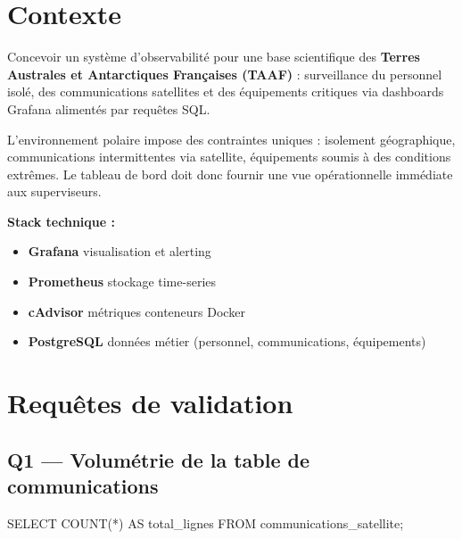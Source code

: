 \documentclass[11pt,a4paper]{article}
\begin{document}
\setcounter{page}{1}

{\sffamily
\hypersetup{linkcolor=primary}
\renewcommand{\contentsname}{\textcolor{accent}{\faList~} Sommaire}
\tableofcontents
}
\vspace{0.4cm}

\section{Contexte}

\begin{infobox}[title={\faSatelliteDish~Mission}]
Concevoir un système d'observabilité pour une base scientifique des \textbf{Terres Australes et Antarctiques Françaises (TAAF)} : surveillance du personnel isolé, des communications satellites et des équipements critiques via dashboards Grafana alimentés par requêtes SQL.
\end{infobox}

L'environnement polaire impose des contraintes uniques : isolement géographique, communications intermittentes via satellite, équipements soumis à des conditions extrêmes. Le tableau de bord doit donc fournir une vue opérationnelle immédiate aux superviseurs.

\medskip
\noindent\textbf{Stack technique :}
\begin{itemize}
  \item \textbf{Grafana} \textemdash{} visualisation et alerting
  \item \textbf{Prometheus} \textemdash{} stockage time-series
  \item \textbf{cAdvisor} \textemdash{} métriques conteneurs Docker
  \item \textbf{PostgreSQL} \textemdash{} données métier (personnel, communications, équipements)
\end{itemize}

\section{Requêtes de validation}

\subsection{Q1 — Volumétrie de la table de communications}

\begin{sqlbox}
SELECT COUNT(*) AS total_lignes
FROM communications_satellite;
\end{sqlbox}
\end{document}
